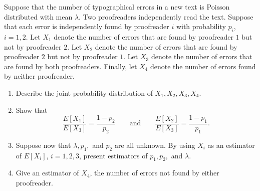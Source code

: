 \begin{exercise}
\label{ex:counting-processes-62}
Suppose that the number of typographical errors in a new text is Poisson distributed with mean $\lambda$. Two proofreaders independently read the text. Suppose that each error is independently found by proofreader $i$ with probability $p_i$, $i=1,2$. Let $X_1$ denote the number of errors that are found by proofreader $1$ but not by proofreader $2$. Let $X_2$ denote the number of errors that are found by proofreader $2$ but not by proofreader $1$. Let $X_3$ denote the number of errors that are found by both proofreaders. Finally, let $X_4$ denote the number of errors found by neither proofreader.
\begin{enumerate}
\item Describe the joint probability distribution of $X_1,X_2,X_3,X_4$.
\item Show that
\[
\frac{E[X_1]}{E[X_3]}=\frac{1-p_2}{p_2}
\qquad\text{and}\qquad
\frac{E[X_2]}{E[X_3]}=\frac{1-p_1}{p_1}.
\]
\item Suppose now that $\lambda,p_1,$ and $p_2$ are all unknown. By using $X_i$ as an estimator of $E[X_i]$, $i=1,2,3$, present estimators of $p_1,p_2,$ and $\lambda$.
\item Give an estimator of $X_4$, the number of errors not found by either proofreader.
\end{enumerate}
\end{exercise}

